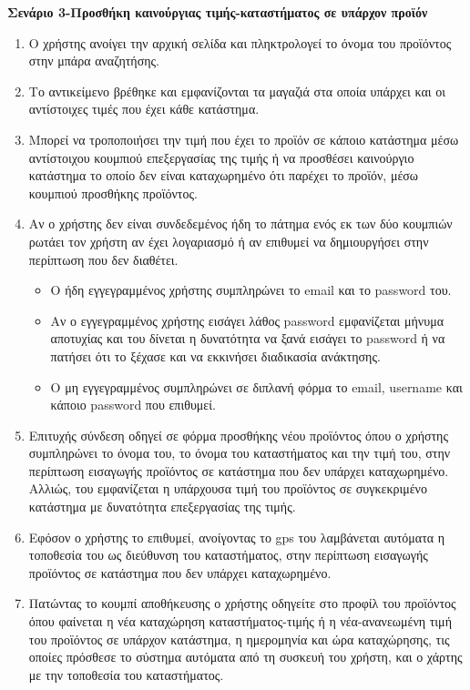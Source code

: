 \documentclass[12pt, oneside, a4paper]{report}
\begin{document}
\vspace{0.5cm}
\textbf{Σενάριο 3-Προσθήκη καινούργιας τιμής-καταστήματος σε υπάρχον προϊόν}\\
\begin{enumerate}
 \item Ο χρήστης ανοίγει την αρχική σελίδα και πληκτρολογεί το όνομα του προϊόντος στην μπάρα αναζητήσης.
 \item Το αντικείμενο βρέθηκε και εμφανίζονται τα μαγαζιά στα οποία υπάρχει και οι αντίστοιχες τιμές που έχει κάθε κατάστημα.
 \item Μπορεί να τροποποιήσει την τιμή που έχει το προϊόν σε κάποιο κατάστημα μέσω αντίστοιχου κουμπιού επεξεργασίας της τιμής ή να προσθέσει καινούργιο κατάστημα το οποίο δεν είναι καταχωρημένο ότι παρέχει το προϊόν, μέσω κουμπιού προσθήκης προϊόντος.
 \item Αν ο χρήστης δεν είναι συνδεδεμένος ήδη το πάτημα ενός εκ των δύο κουμπιών ρωτάει τον χρήστη αν έχει λογαριασμό ή αν επιθυμεί να δημιουργήσει στην περίπτωση που δεν διαθέτει.
 \begin{itemize}
  \item Ο ήδη εγγεγραμμένος χρήστης συμπληρώνει το email και το password του.
  \item Αν ο εγγεγραμμένος χρήστης εισάγει λάθος password εμφανίζεται μήνυμα αποτυχίας και του δίνεται η  δυνατότητα να ξανά εισάγει το password ή να πατήσει ότι το ξέχασε και να εκκινήσει διαδικασία ανάκτησης.
  \item O μη εγγεγραμμένος συμπληρώνει σε διπλανή φόρμα το email, username και κάποιο password που επιθυμεί.
 \end{itemize}

 \item  Επιτυχής σύνδεση οδηγεί σε φόρμα προσθήκης νέου προϊόντος όπου ο χρήστης συμπληρώνει το όνομα του, το όνομα του καταστήματος και την τιμή του, στην περίπτωση εισαγωγής προϊόντος σε κατάστημα που δεν υπάρχει καταχωρημένο. Αλλιώς, του εμφανίζεται η υπάρχουσα τιμή του προϊόντος σε συγκεκριμένο κατάστημα με δυνατότητα επεξεργασίας της τιμής.
 
 \item Εφόσον ο χρήστης το επιθυμεί, ανοίγοντας το gps του λαμβάνεται αυτόματα η τοποθεσία του ως διεύθυνση του καταστήματος, στην περίπτωση εισαγωγής προϊόντος σε κατάστημα που δεν υπάρχει καταχωρημένο.
 \item Πατώντας το κουμπί αποθήκευσης ο χρήστης οδηγείτε στο προφίλ του προϊόντος όπου φαίνεται η νέα καταχώρηση καταστήματος-τιμής ή η νέα-ανανεωμένη τιμή του προϊόντος σε υπάρχον κατάστημα, η ημερομηνία και ώρα καταχώρησης, τις οποίες πρόσθεσε το σύστημα αυτόματα από τη συσκευή του χρήστη, και ο χάρτης με την τοποθεσία του καταστήματος. 
\end{enumerate}
\end{document}
